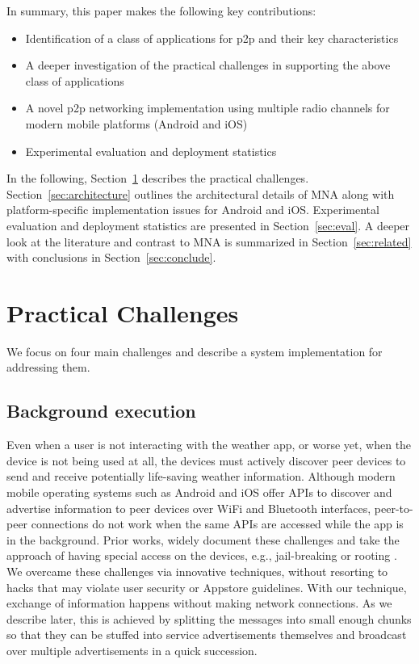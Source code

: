 \documentclass[conference]{IEEEtran}
\begin{document}
In summary, this paper makes the following key contributions:
\begin{itemize}
\item Identification of a class of applications for p2p and their key
  characteristics
\item A deeper investigation of the practical challenges in supporting
  the above class of applications
\item A novel p2p networking implementation using multiple radio
  channels for modern mobile platforms (Android and iOS)
\item Experimental evaluation and deployment statistics
\end{itemize}

In the following, Section~\ref{sec:challenges} describes the practical
challenges. Section~\ref{sec:architecture} outlines the architectural
details of MNA along with platform-specific implementation issues for
Android and iOS. Experimental evaluation and deployment statistics are
presented in Section~\ref{sec:eval}.  A deeper look at the literature
and contrast to MNA is summarized in Section~\ref{sec:related} with
conclusions in Section~\ref{sec:conclude}.
%
\section{Practical Challenges}
\label{sec:challenges}
%
We focus on four main challenges and describe a system implementation
for addressing them. 
%
\subsection{Background execution} 
%
Even when a user is not interacting with the weather app, or worse
yet, when the device is not being used at all, the devices must
actively discover peer devices to send and receive potentially
life-saving weather information. Although modern mobile operating
systems such as Android and iOS offer APIs to discover and advertise
information to peer devices over WiFi and Bluetooth interfaces,
peer-to-peer connections do not work when the same APIs are accessed
while the app is in the background. Prior works, widely document these
challenges and take the approach of having special access on the
devices, e.g., jail-breaking or rooting
\cite{gardner-stephen-serval-2011}. We overcame these challenges via
innovative techniques, without resorting to hacks that may violate
user security or Appstore guidelines. With our technique, exchange of
information happens without making network connections. As we describe
later, this is achieved by splitting the messages into small enough
chunks so that they can be stuffed into service advertisements
themselves and broadcast over multiple advertisements in a quick
succession.
%
\end{document}
